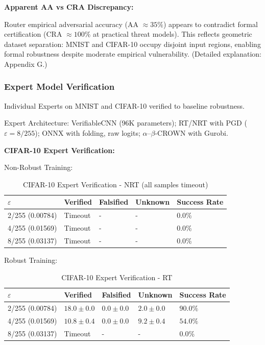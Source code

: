 \documentclass[11pt,a4paper]{article}
\begin{document}
\textbf{Apparent AA vs CRA Discrepancy:}

Router empirical adversarial accuracy (AA $\approx 35\%$) appears to contradict formal certification (CRA $\approx 100\%$ at practical threat models). This reflects geometric dataset separation: MNIST and CIFAR-10 occupy disjoint input regions, enabling formal robustness despite moderate empirical vulnerability. (Detailed explanation: Appendix G.)

\subsubsection{Expert Model Verification}

Individual Experts on MNIST and CIFAR-10 verified to baseline robustness.

Expert Architecture: VerifiableCNN (96K parameters); RT/NRT with PGD ($\varepsilon = 8/255$); ONNX with folding, raw logits; $\alpha$--$\beta$-CROWN with Gurobi.

\textbf{CIFAR-10 Expert Verification:}

Non-Robust Training:

\begin{table}[H]
\centering
\begin{tabular}{lllll}
\toprule
$\varepsilon$ & Verified & Falsified & Unknown & Success Rate \\
\midrule
2/255 (0.00784) & Timeout & - & - & 0.0\% \\
4/255 (0.01569) & Timeout & - & - & 0.0\% \\
8/255 (0.03137) & Timeout & - & - & 0.0\% \\
\bottomrule
\end{tabular}
\caption{CIFAR-10 Expert Verification - NRT (all samples timeout)}
\end{table}

Robust Training:

\begin{table}[H]
\centering
\begin{tabular}{lllll}
\toprule
$\varepsilon$ & Verified & Falsified & Unknown & Success Rate \\
\midrule
2/255 (0.00784) & $18.0 \pm 0.0$ & $0.0 \pm 0.0$ & $2.0 \pm 0.0$ & $90.0\%$ \\
4/255 (0.01569) & $10.8 \pm 0.4$ & $0.0 \pm 0.0$ & $9.2 \pm 0.4$ & $54.0\%$ \\
8/255 (0.03137) & Timeout & - & - & 0.0\% \\
\bottomrule
\end{tabular}
\caption{CIFAR-10 Expert Verification - RT}
\end{table}
\end{document}
